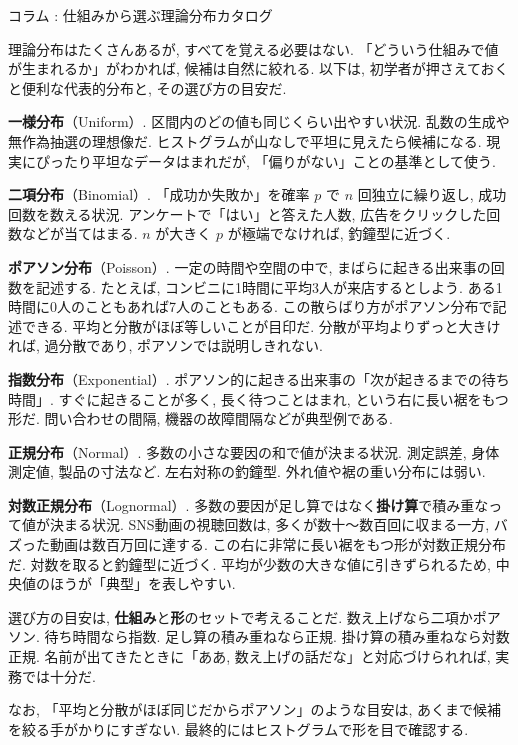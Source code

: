   \begin{mybox}{コラム : 仕組みから選ぶ理論分布カタログ}\label{thm:dist_catalog}

    理論分布はたくさんあるが, すべてを覚える必要はない.
    「どういう仕組みで値が生まれるか」がわかれば, 候補は自然に絞れる.
    以下は, 初学者が押さえておくと便利な代表的分布と, その選び方の目安だ.

    \textbf{一様分布}（Uniform）.
    区間内のどの値も同じくらい出やすい状況.
    乱数の生成や無作為抽選の理想像だ.
    ヒストグラムが山なしで平坦に見えたら候補になる.
    現実にぴったり平坦なデータはまれだが, 「偏りがない」ことの基準として使う.

    \textbf{二項分布}（Binomial）.
    「成功か失敗か」を確率 $p$ で $n$ 回独立に繰り返し, 成功回数を数える状況.
    アンケートで「はい」と答えた人数, 広告をクリックした回数などが当てはまる.
    $n$ が大きく $p$ が極端でなければ, 釣鐘型に近づく.

    \textbf{ポアソン分布}（Poisson）.
    一定の時間や空間の中で, まばらに起きる出来事の回数を記述する.
    たとえば, コンビニに1時間に平均3人が来店するとしよう.
    ある1時間に0人のこともあれば7人のこともある.
    この散らばり方がポアソン分布で記述できる.
    平均と分散がほぼ等しいことが目印だ.
    分散が平均よりずっと大きければ, 過分散であり, ポアソンでは説明しきれない.

    \textbf{指数分布}（Exponential）.
    ポアソン的に起きる出来事の「次が起きるまでの待ち時間」.
    すぐに起きることが多く, 長く待つことはまれ, という右に長い裾をもつ形だ.
    問い合わせの間隔, 機器の故障間隔などが典型例である.

    \textbf{正規分布}（Normal）.
    多数の小さな要因の和で値が決まる状況.
    測定誤差, 身体測定値, 製品の寸法など.
    左右対称の釣鐘型.
    外れ値や裾の重い分布には弱い.

    \textbf{対数正規分布}（Lognormal）.
    多数の要因が足し算ではなく\textbf{掛け算}で積み重なって値が決まる状況.
    SNS動画の視聴回数は, 多くが数十〜数百回に収まる一方, バズった動画は数百万回に達する.
    この右に非常に長い裾をもつ形が対数正規分布だ.
    対数を取ると釣鐘型に近づく.
    平均が少数の大きな値に引きずられるため, 中央値のほうが「典型」を表しやすい.

    \medskip

    選び方の目安は, \textbf{仕組み}と\textbf{形}のセットで考えることだ.
    数え上げなら二項かポアソン.
    待ち時間なら指数.
    足し算の積み重ねなら正規.
    掛け算の積み重ねなら対数正規.
    名前が出てきたときに「ああ, 数え上げの話だな」と対応づけられれば, 実務では十分だ.

    なお, 「平均と分散がほぼ同じだからポアソン」のような目安は, あくまで候補を絞る手がかりにすぎない.
    最終的にはヒストグラムで形を目で確認する.
  \end{mybox}

